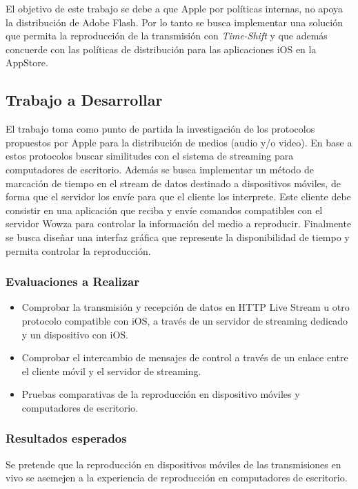 El objetivo de este trabajo se debe a que Apple por políticas internas, no apoya la distribuci\'on de Adobe Flash. Por lo tanto se busca implementar una soluci\'on que permita la reproducci\'on de la transmisi\'on con \textit{Time-Shift} y que adem\'as concuerde con las pol\'iticas de distribuci\'on para las aplicaciones iOS en la AppStore.
 
\large
\subsection*{Trabajo a Desarrollar}
\normalsize
El trabajo toma como punto de partida la investigaci\'on de los protocolos propuestos por Apple para la distribuci\'on de medios (audio y/o video). En base a estos protocolos buscar similitudes con el sistema de streaming para computadores de escritorio. Adem\'as se busca implementar un m\'etodo de marcaci\'on de tiempo en el stream de datos destinado a dispositivos m\'oviles, de forma que el servidor los env\'ie para que el cliente los interprete. Este cliente debe consistir en una aplicación que reciba y env\'ie comandos compatibles con el servidor Wowza para controlar la informaci\'on del medio a reproducir. Finalmente se busca diseñar una interfaz gr\'afica que represente la disponibilidad de tiempo y permita controlar la reproducción.\\

\subsubsection*{Evaluaciones a Realizar}
\normalsize
\begin{itemize}
\item	Comprobar la transmisión y recepción de datos en HTTP Live Stream u otro protocolo compatible con iOS, a través de un servidor de streaming dedicado y un dispositivo con iOS.
\item	Comprobar el intercambio de mensajes de control a través de un enlace entre el cliente móvil y el servidor de streaming.
\item	Pruebas comparativas de la reproducción en dispositivo móviles y computadores de escritorio.
\end{itemize}

\subsubsection*{Resultados esperados}
\normalsize
Se pretende que la reproducción en dispositivos móviles de las transmisiones en vivo se asemejen a la experiencia de reproducción en computadores de escritorio.\\

